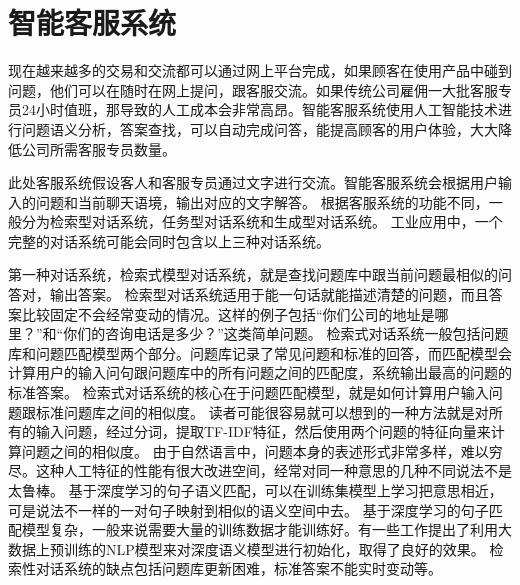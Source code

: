 %
%
%
\chapter{智能客服系统}
\label{basic} %


现在越来越多的交易和交流都可以通过网上平台完成，如果顾客在使用产品中碰到问题，他们可以在随时在网上提问，跟客服交流。如果传统公司雇佣一大批客服专员24小时值班，那导致的人工成本会非常高昂。智能客服系统使用人工智能技术进行问题语义分析，答案查找，可以自动完成问答，能提高顾客的用户体验，大大降低公司所需客服专员数量。

此处客服系统假设客人和客服专员通过文字进行交流。智能客服系统会根据用户输入的问题和当前聊天语境，输出对应的文字解答。
根据客服系统的功能不同，一般分为检索型对话系统，任务型对话系统\cite{young2013pomdp}和生成型对话系统\cite{sutskever2014sequence,shang2015neural,serban2016building,serban2016hierarchical}。
工业应用中，一个完整的对话系统可能会同时包含以上三种对话系统。

第一种对话系统，检索式模型对话系统，就是查找问题库中跟当前问题最相似的问答对，输出答案。
检索型对话系统适用于能一句话就能描述清楚的问题，而且答案比较固定不会经常变动的情况。这样的例子包括``你们公司的地址是哪里？''和``你们的咨询电话是多少？''这类简单问题。
检索式对话系统一般包括问题库和问题匹配模型两个部分。问题库记录了常见问题和标准的回答，而匹配模型会计算用户的输入问句跟问题库中的所有问题之间的匹配度，系统输出最高的问题的标准答案。
检索式对话系统的核心在于问题匹配模型，就是如何计算用户输入问题跟标准问题库之间的相似度。
读者可能很容易就可以想到的一种方法就是对所有的输入问题，经过分词，提取TF-IDF特征，然后使用两个问题的特征向量来计算问题之间的相似度。
由于自然语言中，问题本身的表述形式非常多样，难以穷尽。这种人工特征的性能有很大改进空间，经常对同一种意思的几种不同说法不是太鲁棒。
基于深度学习的句子语义匹配，可以在训练集模型上学习把意思相近，可是说法不一样的一对句子映射到相似的语义空间中去。
基于深度学习的句子匹配模型复杂，一般来说需要大量的训练数据才能训练好。有一些工作提出了利用大数据上预训练的NLP模型来对深度语义模型进行初始化，取得了良好的效果。
检索性对话系统的缺点包括问题库更新困难，标准答案不能实时变动等。

